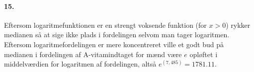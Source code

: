 \paragraph{15.}

Eftersom logaritmefunktionen er en strengt voksende funktion (for
$x>0$) rykker medianen så at sige ikke plads i fordelingen selvom man
tager logaritmen. Eftersom logaritmefordelingen er mere koncentreret
ville et godt bud på medianen i fordelingen af A-vitamindtaget for
mænd være $e$ opløftet i middelværdien for logaritmen af fordelingen,
altså $e^(7,485) = 1781.11$.
